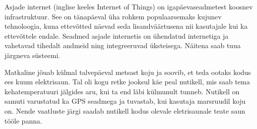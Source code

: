 \documentclass[12pt]{article}
\newcommand{\newlinespacer}{{%
    \newline
    \newline
  }}%
\begin{document}


  Asjade internet (inglise keeles Internet of Things) on igapäevaseadmetest koosnev infrastruktuur.
  See on tänapäeval üha rohkem populaarsemaks kujunev tehnoloogia, kuna ettevõtted näevad seda
  lisandväärtusena nii kasutajale kui ka ettevõttele endale. Seadmed asjade internetis on ühendatud
  internetiga ja vahetavad tihedalt andmeid ning integreeruvad üksteisega. Näitena saab tuua järgneva
  süsteemi.

  Matkaline jõuab külmal talvepäeval metsast koju ja soovib, et teda ootaks kodus ees kuum elektrisaun.
  Tal oli kogu retke jooksul käe peal nutikell, mis saab tema kehatemperatuuri jälgides aru, kui
  ta end läbi külmunult tunneb. Nutikell on samuti varustatud ka GPS seadmega ja tuvastab, kui
  kasutaja marsruudil koju on. Nende vaatluste järgi saadab nutikell kodus olevale eletrisaunale
  teate saun tööle panna.
  
\end{document}
